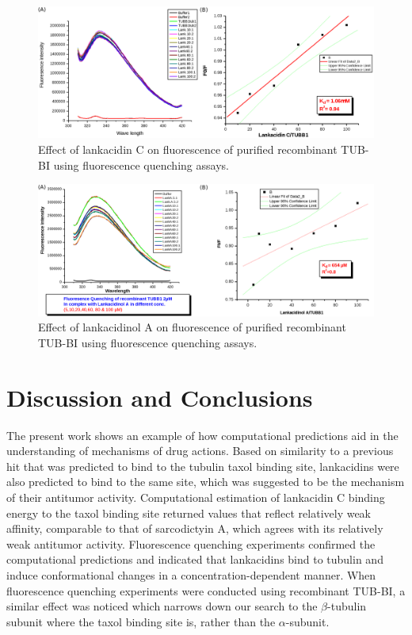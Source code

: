 \documentclass[11pt]{report}
\begin{document}
\begin{figure}
\centering
\includegraphics[width=1.0\linewidth]{images/LankC_Recom.pdf}
\caption[Effect of lankacidin C on fluorescence of purified recombinant TUB-BI]{
Effect of lankacidin C on fluorescence of purified recombinant TUB-BI using fluorescence
quenching assays.}
\label{f:Lank-LankC_Recom}
\end{figure}


\begin{figure}
\centering
\includegraphics[width=1.0\linewidth]{images/LankA_Recom.pdf}
\caption[Effect of lankacidinol A on fluorescence of purified recombinant TUB-BI]{ 
Effect of lankacidinol A on fluorescence of purified recombinant TUB-BI using fluorescence
quenching assays.}
\label{f:Lank-LankA_Recom}
\end{figure}

\section{Discussion and Conclusions}

The present work shows an example of how computational predictions 
aid in the understanding of mechanisms of drug actions. Based on similarity to
a previous hit that was predicted to bind to the tubulin taxol binding site,
lankacidins were also predicted to bind to the same site, which 
was suggested to be the mechanism of their antitumor activity.
Computational estimation of lankacidin C binding energy to the taxol binding site
returned values that reflect relatively weak affinity, comparable to that of 
sarcodictyin A, which agrees with its relatively weak antitumor activity.  
Fluorescence quenching experiments confirmed the computational predictions
and indicated that lankacidins bind to tubulin and induce conformational changes
in a concentration-dependent manner. When fluorescence quenching experiments were conducted using recombinant TUB-BI,
a similar effect was noticed which narrows down our search to the $\beta$-tubulin
subunit where the taxol binding site is, rather than the $\alpha$-subunit.
\end{document}
